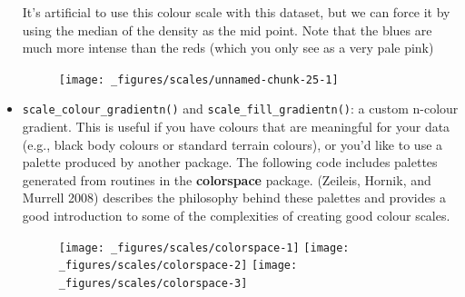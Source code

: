 \begin{itemize}
  It's artificial to use this colour scale with this dataset, but we can
  force it by using the median of the density as the mid point. Note
  that the blues are much more intense than the reds (which you only see
  as a very pale pink)

\begin{Shaded}
\begin{Highlighting}[]
\StringTok{ }
\StringTok{ }\NormalTok{(} 
\end{Highlighting}
\end{Shaded}

  \begin{figure}[H]
    \texttt{[image: \_figures/scales/unnamed-chunk-25-1]}
  \end{figure}
\item
  \texttt{scale\_colour\_gradientn()} and
  \texttt{scale\_fill\_gradientn()}: a custom n-colour gradient. This is
  useful if you have colours that are meaningful for your data (e.g.,
  black body colours or standard terrain colours), or you'd like to use
  a palette produced by another package. The following code includes
  palettes generated from routines in the \textbf{colorspace} package.
  (Zeileis, Hornik, and Murrell 2008) describes the philosophy behind
  these palettes and provides a good introduction to some of the
  complexities of creating good colour scales. 
   

\begin{Shaded}
\begin{Highlighting}[]
\StringTok{ }\NormalTok{(} \NormalTok{(}\NormalTok{))}
\StringTok{ }\NormalTok{(} \NormalTok{(}\NormalTok{))}
\StringTok{ }\NormalTok{(} \NormalTok{(}\NormalTok{))}
\end{Highlighting}
\end{Shaded}

  \begin{figure}[H]
    \texttt{[image: \_figures/scales/colorspace-1]}%
    \texttt{[image: \_figures/scales/colorspace-2]}%
    \texttt{[image: \_figures/scales/colorspace-3]}
  \end{figure}


\end{itemize}
